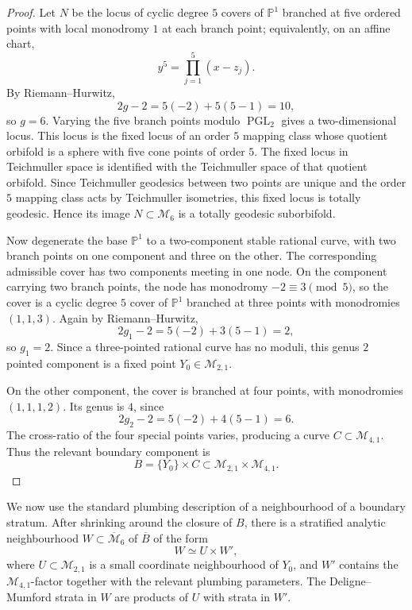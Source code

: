 \documentclass[11pt]{article}
\begin{document}
\begin{proof}
Let \(N\) be the locus of cyclic degree \(5\) covers of \(\mathbb P^1\)
branched at five ordered points with local monodromy \(1\) at each branch
point; equivalently, on an affine chart,
\[
 y^5=\prod_{j=1}^5 (x-z_j).
\]
By Riemann--Hurwitz,
\[
 2g-2=5(-2)+5(5-1)=10,
\]
so \(g=6\).  Varying the five branch points modulo
\(\operatorname{PGL}_2\) gives a two-dimensional locus.  This locus is the
fixed locus of an order \(5\) mapping class whose quotient orbifold is a
sphere with five cone points of order \(5\).  The fixed locus in
Teichmuller space is identified with the Teichmuller space of that quotient
orbifold.  Since Teichmuller geodesics between two points are unique and
the order \(5\) mapping class acts by Teichmuller isometries, this fixed
locus is totally geodesic.  Hence its image \(N\subset \mathcal M_6\) is a
totally geodesic suborbifold.

Now degenerate the base \(\mathbb P^1\) to a two-component stable rational
curve, with two branch points on one component and three on the other.  The
corresponding admissible cover has two components meeting in one node.  On
the component carrying two branch points, the node has monodromy
\(-2\equiv 3\pmod 5\), so the cover is a cyclic degree \(5\) cover of
\(\mathbb P^1\) branched at three points with monodromies \((1,1,3)\).
Again by Riemann--Hurwitz,
\[
 2g_1-2=5(-2)+3(5-1)=2,
\]
so \(g_1=2\).  Since a three-pointed rational curve has no moduli, this
genus \(2\) pointed component is a fixed point
\(Y_0\in \mathcal M_{2,1}\).

On the other component, the cover is branched at four points, with
monodromies \((1,1,1,2)\).  Its genus is \(4\), since
\[
 2g_2-2=5(-2)+4(5-1)=6.
\]
The cross-ratio of the four special points varies, producing a curve
\(C\subset \mathcal M_{4,1}\).  Thus the relevant boundary component is
\[
 B=\{Y_0\}\times C\subset \mathcal M_{2,1}\times \mathcal M_{4,1}.
\]
\end{proof}

We now use the standard plumbing description of a neighbourhood of a
boundary stratum.  After shrinking around the closure of \(B\), there is a
stratified analytic neighbourhood \(W\subset \overline{\mathcal M}_6\) of
\(\overline B\) of the form
\[
 W\simeq U\times W',
\]
where \(U\subset \mathcal M_{2,1}\) is a small coordinate neighbourhood of
\(Y_0\), and \(W'\) contains the \(\mathcal M_{4,1}\)-factor together with
the relevant plumbing parameters.  The Deligne--Mumford strata in \(W\) are
products of \(U\) with strata in \(W'\).
\end{document}
